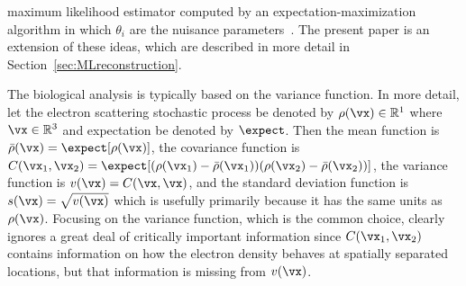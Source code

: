 maximum likelihood estimator computed by an expectation-maximization
algorithm in which $\theta_i$ are the nuisance
parameters~\cite{YiliZhengQiuWangDoerschukJOSA2012,QiuWangMatsuiDomitrovicYiliZhengDoerschukJohnsonJSB2012,TangKearneyQiuWangDoerschukBakerJohnsonJMolRecog2014,DomitrovicMovahedBothnerMatsuiQiuWangDoerschukJohnsonJMB2013,YunyeGongVeeslerDoerschukJohnsonJSB2016,DoerschukGongXuDomitrovicJohnsonCurOpinVirology2016,XuVeeslerDoerschukJohnsonHK97JSB2017}.
The present paper is an extension of these ideas, which are described in
more detail in Section~\ref{sec:MLreconstruction}.
\par
The biological analysis is typically based on the variance function.
In more detail, let the electron scattering stochastic process be denoted
by $\rho(\vx)\in\mathbb{R}^1$ where $\vx\in\mathbb{R}^3$ and expectation be denoted by
$\expect$.
Then the mean function is $\bar\rho(\vx)=\expect[\rho(\vx)]$, the
covariance function is
$C(\vx_1,\vx_2)=\expect[(\rho(\vx_1)-\bar\rho(\vx_1))(\rho(\vx_2)-\bar\rho(\vx_2))]$,
the variance function is $v(\vx)=C(\vx,\vx)$, and the standard
deviation function is $s(\vx)=\sqrt{v(\vx)}$ which is usefully primarily
because it has the same units as $\rho(\vx)$.
Focusing on the variance function, which is the common choice, clearly
ignores a great deal of critically important information
since $C(\vx_1,\vx_2)$ contains information on how the electron
density behaves at spatially separated locations, but that information is
missing from $v(\vx)$.
